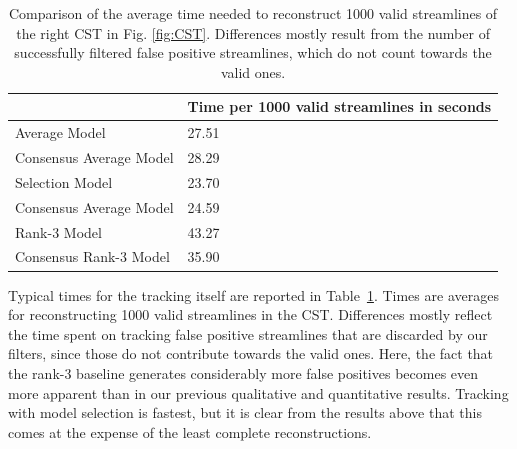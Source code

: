 \begin{table}
\centering
\begin{tabular}{p{4cm}p{3cm}}
	{}  & Time per 1000 valid streamlines in seconds\\ \hline  
	Average Model & 27.51\\
	Consensus Average Model & 28.29\\
	Selection Model & 23.70\\
	Consensus Average Model & 24.59 \\
	Rank-3 Model &  43.27\\
	Consensus Rank-3 Model & 35.90\\
\end{tabular}

\caption{Comparison of the average time needed to reconstruct 1000 valid streamlines of
  the right CST in Fig. \ref{fig:CST}. Differences mostly result from the number of successfully filtered false positive streamlines, which do not count towards the valid ones.}
	\label{tab:tracking-times}
\end{table}

Typical times for the tracking itself are reported in Table~\ref{tab:tracking-times}. Times are averages for reconstructing 1000 valid streamlines in the CST. Differences mostly reflect the time spent on tracking false positive streamlines that are discarded by our filters, since those do not contribute towards the valid ones. Here, the fact that the rank-3 baseline generates considerably more false positives becomes even more apparent than in our previous qualitative and quantitative results. Tracking with model selection is fastest, but it is clear from the results above that this comes at the expense of the least complete reconstructions.


